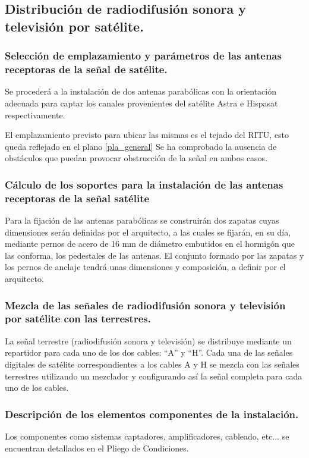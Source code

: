 \subsection{Distribución de radiodifusión sonora y televisión por satélite.}

\subsubsection{Selección de emplazamiento y parámetros de las antenas receptoras de la señal de satélite.}

Se procederá a la instalación de dos antenas parabólicas con la orientación adecuada para captar los canales provenientes del satélite Astra e Hispasat respectivamente.

El emplazamiento previsto para ubicar las mismas es el tejado del RITU, esto queda reflejado en el plano \ref{pla_general}
Se ha comprobado la ausencia de obstáculos que puedan provocar obstrucción de la señal en ambos casos.


\subsubsection{Cálculo de los soportes para la instalación de las antenas receptoras de la señal satélite}

Para la fijación de las antenas parabólicas se construirán dos zapatas cuyas dimensiones serán definidas por el arquitecto, a las cuales se fijarán, en su día, mediante pernos de acero de 16 mm de diámetro embutidos en el hormigón que las conforma, los pedestales de las antenas.
El conjunto formado por las zapatas y los pernos de anclaje tendrá unas dimensiones y composición, a definir por el arquitecto.


\subsubsection{Mezcla de las señales de radiodifusión sonora y televisión por satélite con las terrestres.}

La señal terrestre (radiodifusión sonora y televisión) se distribuye mediante un repartidor para cada uno de los dos cables: ``A'' y ``H''. Cada una de las señales digitales de satélite correspondientes a los cables A y H se mezcla con las señales terrestres utilizando un mezclador y configurando así la señal completa para cada uno de los cables.

\subsubsection{Descripción de los elementos componentes de la instalación.}
Los componentes como sistemas captadores, amplificadores, cableado, etc... se encuentran detallados en el Pliego de Condiciones.
